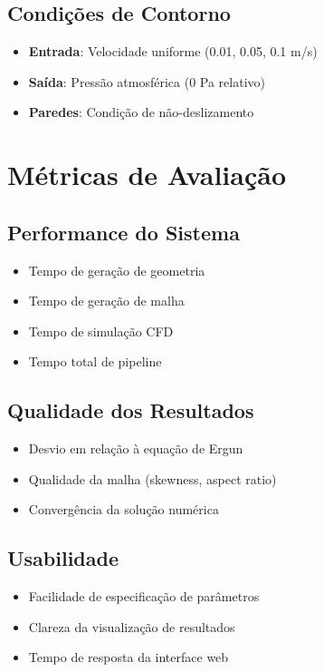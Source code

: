 \subsection{Condições de Contorno}

\begin{itemize}
    \item \textbf{Entrada}: Velocidade uniforme (0.01, 0.05, 0.1 m/s)
    \item \textbf{Saída}: Pressão atmosférica (0 Pa relativo)
    \item \textbf{Paredes}: Condição de não-deslizamento
\end{itemize}

\section{Métricas de Avaliação}

\subsection{Performance do Sistema}

\begin{itemize}
    \item Tempo de geração de geometria
    \item Tempo de geração de malha
    \item Tempo de simulação CFD
    \item Tempo total de pipeline
\end{itemize}

\subsection{Qualidade dos Resultados}

\begin{itemize}
    \item Desvio em relação à equação de Ergun
    \item Qualidade da malha (skewness, aspect ratio)
    \item Convergência da solução numérica
\end{itemize}

\subsection{Usabilidade}

\begin{itemize}
    \item Facilidade de especificação de parâmetros
    \item Clareza da visualização de resultados
    \item Tempo de resposta da interface web
\end{itemize}

